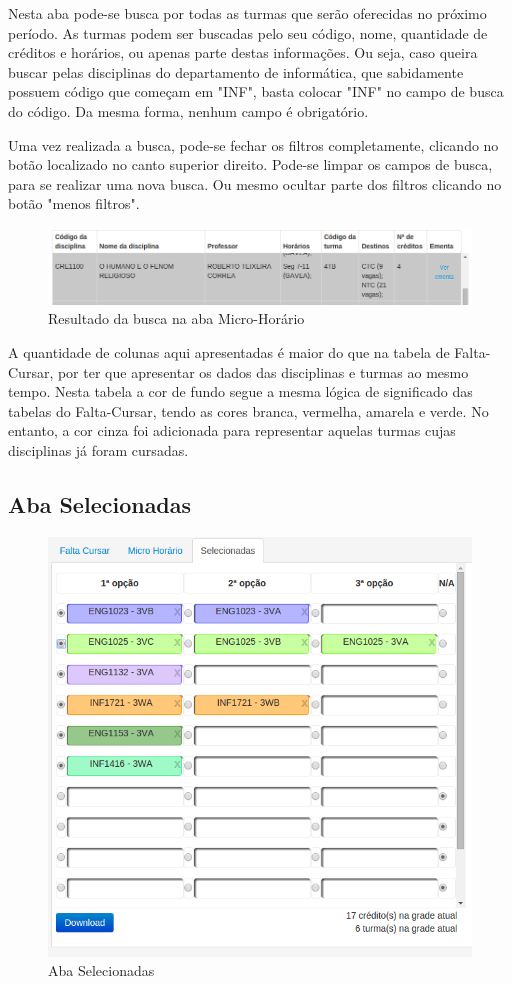 \documentclass[graduacao,brazil]{ThesisPUC}
\begin{document}
Nesta aba pode-se busca por todas as turmas que serão oferecidas no próximo período. As turmas podem ser buscadas pelo seu código, nome, quantidade de créditos e horários, ou apenas parte destas informações. Ou seja, caso queira buscar pelas disciplinas do departamento de informática, que sabidamente possuem código que começam em "INF", basta colocar "INF" no campo de busca do código. Da mesma forma, nenhum campo é obrigatório. 

Uma vez realizada a busca, pode-se fechar os filtros completamente, clicando no botão localizado no canto superior direito. Pode-se limpar os campos de busca, para se realizar uma nova busca. Ou mesmo ocultar parte dos filtros clicando no botão "menos filtros".

\begin{figure}[H]
    \centering
    \includegraphics[width=0.8\linewidth]{img/v3_disciplina_cursada.png}
    \caption{Resultado da busca na aba Micro-Horário}
\end{figure}

A quantidade de colunas aqui apresentadas é maior do que na tabela de Falta-Cursar, por ter que apresentar os dados das disciplinas e turmas ao mesmo tempo. Nesta tabela a cor de fundo segue a mesma lógica de significado das tabelas do Falta-Cursar, tendo as cores branca, vermelha, amarela e verde. No entanto, a cor cinza foi adicionada para representar aquelas turmas cujas disciplinas já foram cursadas.

\subsection{Aba Selecionadas}

\begin{figure}[H]
    \centering
    \includegraphics[width=0.8\linewidth]{img/v3_aba_selecionadas.png}
    \caption{Aba Selecionadas}
\end{figure}
\end{document}
